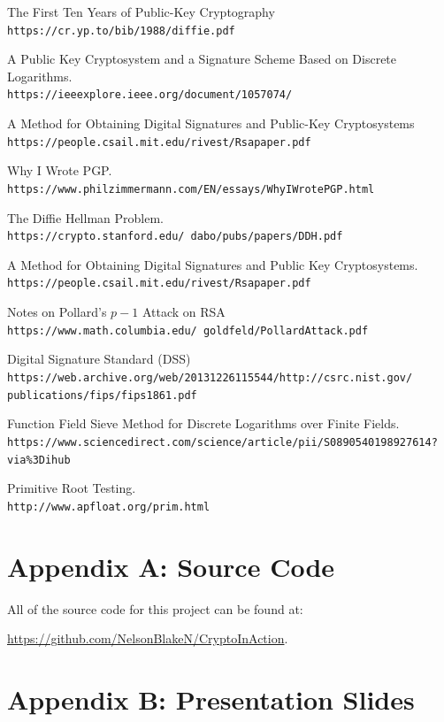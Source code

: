 \documentclass[12pt]{report}
\begin{document}
\begin{thebibliography}{9}

    The First Ten Years of Public-Key Cryptography\\
    \texttt{https://cr.yp.to/bib/1988/diffie.pdf}
    
    A Public Key Cryptosystem and a Signature Scheme Based on Discrete Logarithms.\\
    \texttt{https://ieeexplore.ieee.org/document/1057074/}

    A Method for Obtaining Digital Signatures and Public-Key Cryptosystems\\
    \texttt{https://people.csail.mit.edu/rivest/Rsapaper.pdf}
    
    Why I Wrote PGP.\\
    \texttt{https://www.philzimmermann.com/EN/essays/WhyIWrotePGP.html}
    
    The Diffie Hellman Problem.\\
    \texttt{https://crypto.stanford.edu/~dabo/pubs/papers/DDH.pdf}
    
    A Method for Obtaining Digital Signatures and Public Key Cryptosystems.\\
    \texttt{https://people.csail.mit.edu/rivest/Rsapaper.pdf}

    Notes on Pollard's $p-1$ Attack on RSA\\
    \texttt{https://www.math.columbia.edu/~goldfeld/PollardAttack.pdf}

    Digital Signature Standard (DSS)\\
    \texttt{https://web.archive.org/web/20131226115544/http://csrc.nist.gov/\\publications/fips/fips1861.pdf}
    
    Function Field Sieve Method for Discrete Logarithms over Finite Fields.\\
    \texttt{https://www.sciencedirect.com/science/article/pii/S0890540198927614?via\%3Dihub}

    Primitive Root Testing.\\
    \texttt{http://www.apfloat.org/prim.html}

\end{thebibliography}

\newpage
\section{Appendix A: Source Code}
All of the source code for this project can be found at:

\href{https://github.com/NelsonBlakeN/CryptoInAction}{https://github.com/NelsonBlakeN/CryptoInAction}.

\newpage
\section{Appendix B: Presentation Slides}
\end{document}
